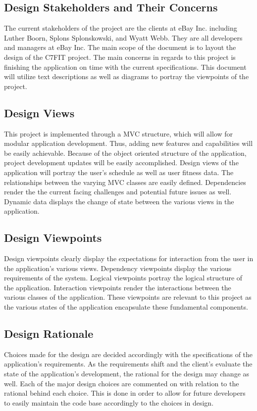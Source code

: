 \documentclass[letterpaper,10pt,titlepage]{article}
\begin{document}
\subsection{Design Stakeholders and Their Concerns}
The current stakeholders of the project are the clients at eBay Inc. including Luther Boorn, Splons Splonskowski, and Wyatt Webb. They are all developers and managers at eBay Inc. The main scope of the document is to layout the design of the C7FIT project. The main concerns in regards to this project is finishing the application on time with the current specifications. This document will utilize text descriptions as well as diagrams to portray the viewpoints of the project.

\subsection{Design Views}
This project is implemented through a MVC structure, which will allow for modular application development. Thus, adding new features and capabilities will be easily achievable. Because of the object oriented structure of the application, project development updates will be easily accomplished. Design views of the application will portray the user's schedule as well as user fitness data. The relationships between the varying MVC classes are easily defined. Dependencies render the the current facing challenges and potential future issues as well. Dynamic data displays the change of state between the various views in the application.

\subsection{Design Viewpoints}
Design viewpoints clearly display the expectations for interaction from the user in the application's various views. Dependency viewpoints display the various requirements of the system. Logical viewpoints portray the logical structure of the application. Interaction viewpoints render the interactions between the various classes of the application. These viewpoints are relevant to this project as the various states of the application encapsulate these fundamental components.

\subsection{Design Rationale}
Choices made for the design are decided accordingly with the specifications of the application's requirements. As the requirements shift and the client's evaluate the state of the application's development, the rational for the design may change as well. Each of the major design choices are commented on with relation to the rational behind each choice. This is done in order to allow for future developers to easily maintain the code base accordingly to the choices in design.
\end{document}
